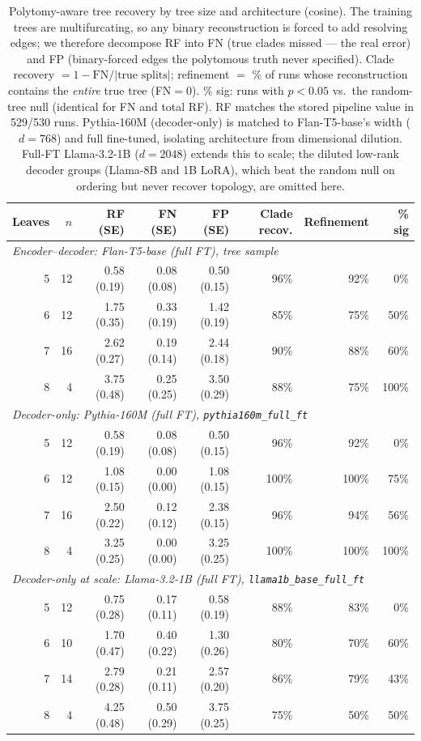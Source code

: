 \documentclass{article}
\theoremstyle{definition}
\theoremstyle{plain}
\begin{document}
\begin{table}[t]
\caption{Polytomy-aware tree recovery by tree size and architecture (cosine). The training
  trees are multifurcating, so any binary reconstruction is forced to add resolving edges;
  we therefore decompose RF into FN (true clades missed --- the real error) and FP
  (binary-forced edges the polytomous truth never specified). Clade recovery
  $= 1 - \mathrm{FN}/|\text{true splits}|$; refinement $=$ \% of runs whose reconstruction
  contains the \emph{entire} true tree (FN$=0$). \% sig: runs with $p<0.05$ vs.\ the
  random-tree null (identical for FN and total RF). RF matches the stored pipeline value in
  529/530 runs. Pythia-160M (decoder-only) is matched to Flan-T5-base's width ($d=768$) and
  full fine-tuned, isolating architecture from dimensional dilution. Full-FT Llama-3.2-1B
  ($d=2048$) extends this to scale; the diluted low-rank decoder groups (Llama-8B and 1B LoRA),
  which beat the random null on ordering but never recover topology, are omitted here.}
\label{tab:rf_by_leaves}
\begin{center}
\begin{tabular}{rrrrrrrr}
\toprule
Leaves & $n$ & RF (SE) & FN (SE) & FP (SE) & Clade recov. & Refinement & \% sig \\
\midrule
\multicolumn{8}{l}{\textit{Encoder--decoder: Flan-T5-base (full FT), tree sample}} \\
5 & 12 & 0.58 (0.19) & 0.08 (0.08) & 0.50 (0.15) & 96\% & 92\% &   0\% \\
6 & 12 & 1.75 (0.35) & 0.33 (0.19) & 1.42 (0.19) & 85\% & 75\% &  50\% \\
7 & 16 & 2.62 (0.27) & 0.19 (0.14) & 2.44 (0.18) & 90\% & 88\% &  60\% \\
8 &  4 & 3.75 (0.48) & 0.25 (0.25) & 3.50 (0.29) & 88\% & 75\% & 100\% \\
\midrule
\multicolumn{8}{l}{\textit{Decoder-only: Pythia-160M (full FT), \texttt{pythia160m\_full\_ft}}} \\
5 & 12 & 0.58 (0.19) & 0.08 (0.08) & 0.50 (0.15) & 96\% & 92\% &   0\% \\
6 & 12 & 1.08 (0.15) & 0.00 (0.00) & 1.08 (0.15) & 100\% & 100\% &  75\% \\
7 & 16 & 2.50 (0.22) & 0.12 (0.12) & 2.38 (0.15) & 96\% & 94\% &  56\% \\
8 &  4 & 3.25 (0.25) & 0.00 (0.00) & 3.25 (0.25) & 100\% & 100\% & 100\% \\
\midrule
\multicolumn{8}{l}{\textit{Decoder-only at scale: Llama-3.2-1B (full FT), \texttt{llama1b\_base\_full\_ft}}} \\
5 & 12 & 0.75 (0.28) & 0.17 (0.11) & 0.58 (0.19) & 88\% & 83\% &   0\% \\
6 & 10 & 1.70 (0.47) & 0.40 (0.22) & 1.30 (0.26) & 80\% & 70\% &  60\% \\
7 & 14 & 2.79 (0.28) & 0.21 (0.11) & 2.57 (0.20) & 86\% & 79\% &  43\% \\
8 &  4 & 4.25 (0.48) & 0.50 (0.29) & 3.75 (0.25) & 75\% & 50\% &  50\% \\
\bottomrule
\end{tabular}
\end{center}
\end{table}
\end{document}
